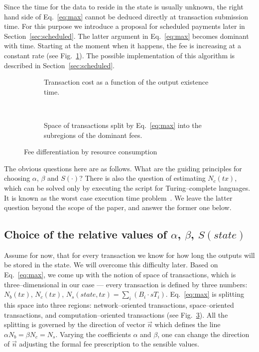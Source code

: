 \documentclass[]{llncs}   %
\begin{document}
Since the time for the data to reside in the state is usually unknown,
the right hand side of Eq.~\eqref{eq:max} cannot be deduced directly at
transaction submission time. For this purpose we introduce a proposal for 
scheduled payments later in Section~\ref{sec:scheduled}. The latter
argument in Eq.~\eqref{eq:max} becomes dominant with time. Starting at the moment when it happens, the
fee is increasing at a constant rate (see Fig.~\ref{fig:max_t}). The possible implementation of this 
algorithm is described in Section~\ref{sec:scheduled}.
\begin{figure}
    \centering
    \begin{subfigure}[b]{.45\textwidth}
    
    \caption{Transaction cost as a function of the output existence time.
        \newline
        \label{fig:max_t}}
    \end{subfigure}
    ~
    \begin{subfigure}[b]{.45\textwidth}
        
        \caption{Space of transactions split by
            Eq.~\eqref{eq:max} into the subregions of the dominant fees.
            \label{fig:max}}
        \end{subfigure}
        \caption{Fee differentiation by resource consumption}
\end{figure}

The obvious questions here are as follows. What are the guiding principles for
choosing $\alpha$, $\beta$ and $S(\cdot)$? There is also the
question of estimating $N_c(tx)$, which can be solved only by executing the
script for Turing--complete languages. It is known as the worst case execution
time problem~\cite{Wilhelm2008}.  We leave the latter question beyond the scope of
the paper, and answer the former one below.

\subsection{Choice of the relative values of $\alpha$, $\beta$, $S(state)$}

Assume for now, that for every transaction we know for how long the outputs will be
stored in the state. We will overcome this difficulty later. Based on
Eq.~\eqref{eq:max}, we come up with the notion of space of transactions, which
is three--dimensional in our case --- every transaction is defined by three
numbers: $N_b(tx)$, $N_c(tx)$, $N_s(state,tx) = \sum_i (B_i \cdot sT_i)$. Eq.~\eqref{eq:max} is splitting 
this space into three regions: network--oriented transactions, space--oriented transactions, 
and computation--oriented transactions (see Fig.~\ref{fig:max}). All the splitting 
is governed by the direction of vector $\vec{n}$ which defines the line $\alpha N_b=\beta N_c=N_s$.
Varying the coefficients $\alpha$ and $\beta$, one can change the direction of
$\vec{n}$ adjusting the formal fee prescription to the sensible values.
\end{document}
